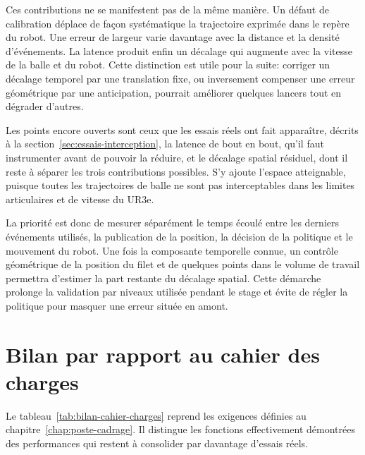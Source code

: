 \documentclass[a4paper,11pt]{report}
\begin{document}
Ces contributions ne se manifestent pas de la même manière. Un défaut de
calibration déplace de façon systématique la trajectoire exprimée dans le repère
du robot. Une erreur de largeur varie davantage avec la distance et la densité
d'événements. La latence produit enfin un décalage qui augmente avec la vitesse
de la balle et du robot. Cette distinction est utile pour la suite: corriger un
décalage temporel par une translation fixe, ou inversement compenser une erreur
géométrique par une anticipation, pourrait améliorer quelques lancers tout en
dégrader d'autres.

Les points encore ouverts sont ceux que les essais réels ont fait apparaître, décrits à la section~\ref{sec:essais-interception}, la latence de bout en bout, qu'il faut instrumenter avant de pouvoir la réduire, et le décalage spatial résiduel, dont il reste à séparer les trois contributions possibles. S'y ajoute l'espace atteignable, puisque toutes les trajectoires de balle ne sont pas interceptables dans les limites articulaires et de vitesse du UR3e.

La priorité est donc de mesurer séparément le temps écoulé entre les derniers
événements utilisés, la publication de la position, la décision de la politique
et le mouvement du robot. Une fois la composante temporelle connue, un contrôle
géométrique de la position du filet et de quelques points dans le volume de
travail permettra d'estimer la part restante du décalage spatial. Cette démarche
prolonge la validation par niveaux utilisée pendant le stage et évite de régler
la politique pour masquer une erreur située en amont.

\section{Bilan par rapport au cahier des charges}

Le tableau~\ref{tab:bilan-cahier-charges} reprend les exigences définies au
chapitre~\ref{chap:poste-cadrage}. Il distingue les fonctions effectivement
démontrées des performances qui restent à consolider par davantage d'essais
réels.
\end{document}

